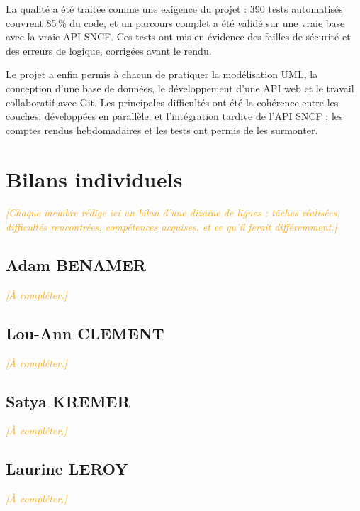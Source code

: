 \documentclass[11pt,a4paper]{article}
\newcommand{\acompleter}[1]{\textcolor{orange}{\textit{[#1]}}}
\begin{document}
La qualité a été traitée comme une exigence du projet : 390 tests automatisés couvrent 85\,\% du
code, et un parcours complet a été validé sur une vraie base avec la vraie API SNCF. Ces tests ont
mis en évidence des failles de sécurité et des erreurs de logique, corrigées avant le rendu.

Le projet a enfin permis à chacun de pratiquer la modélisation UML, la conception d'une base de
données, le développement d'une API web et le travail collaboratif avec Git. Les principales
difficultés ont été la cohérence entre les couches, développées en parallèle, et l'intégration
tardive de l'API SNCF ; les comptes rendus hebdomadaires et les tests ont permis de les surmonter.

\newpage
\appendix
\section{Bilans individuels}

\acompleter{Chaque membre rédige ici un bilan d'une dizaine de lignes : tâches réalisées,
difficultés rencontrées, compétences acquises, et ce qu'il ferait différemment.}

\subsection*{Adam BENAMER}
\acompleter{À compléter.}

\subsection*{Lou-Ann CLEMENT}
\acompleter{À compléter.}

\subsection*{Satya KREMER}
\acompleter{À compléter.}

\subsection*{Laurine LEROY}
\acompleter{À compléter.}
\end{document}

